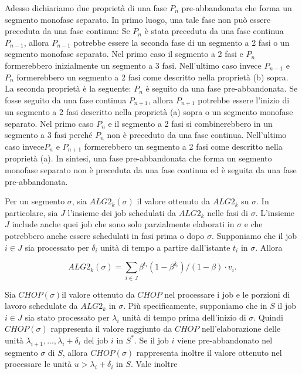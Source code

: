 \documentclass[12pt]{article}
\begin{document}
Adesso dichiariamo due proprietà di una fase $P_{n}$ pre-abbandonata che forma un segmento monofase separato. In primo luogo, una tale fase non può essere preceduta da una fase continua: Se $P_{n}$ è stata preceduta da una fase continua $P_{n-1}$, allora $P_{n-1}$ potrebbe essere la seconda fase di un segmento a 2 fasi o un segmento monofase separato. Nel primo caso il segmento a 2 fasi e $P_{n}$ formerebbero inizialmente un segmento a 3 fasi. Nell'ultimo caso invece $P_{n-1}$ e $P_{n}$ formerebbero un segmento a 2 fasi come descritto nella proprietà (b) sopra. La seconda proprietà è la seguente: $P_{n}$ è seguito da una fase pre-abbandonata. Se fosse seguito da una fase continua $P_{n+1}$, allora $P_{n+1}$ potrebbe essere l'inizio di un segmento a 2 fasi descritto nella proprietà (a) sopra o un segmento monofase separato. Nel primo caso $P_{n}$ e il segmento a 2 fasi si combinerebbero in un segmento a 3 fasi perché $P_{n}$ non è preceduto da una fase continua. Nell'ultimo caso invece$P_{n}$ e $P_{n+1}$ formerebbero un segmento a 2 fasi come descritto nella proprietà (a). In sintesi, una fase pre-abbandonata che forma un segmento monofase separato non è preceduta da una fase continua ed è seguita da una fase pre-abbandonata.

Per un segmento $\sigma$, sia $ALG2_{k}(\sigma)$ il valore ottenuto da $ALG2_{k}$ su $\sigma$. In particolare, sia $J$ l'insieme dei job schedulati da $ALG2_{k}$ nelle fasi di $\sigma$. L'insieme $J$ include anche quei job che sono solo parzialmente elaborati in $\sigma$ e che potrebbero anche essere schedulati in fasi prima o dopo $\sigma$. Supponiamo che il job $i \in J$ sia processato per $\delta_{i}$ unità di tempo a partire dall'istante $t_{i}$ in $\sigma$. Allora

$$ALG2_{k}(\sigma) = \sum_{i \in J} \beta^{t_{i}}(1 - \beta^{\delta_{i}})/(1 - \beta) \cdot v_{i}.$$

Sia $CHOP(\sigma)$il valore ottenuto da $CHOP$ nel processare i job  e le porzioni di lavoro schedulate da $ALG2_{k}$ in $\sigma$. Più specificamente, supponiamo che in $S$ il job $i \in J$ sia stato processato per $\lambda_{i}$ unità di tempo prima dell'inizio di $\sigma$. Quindi $CHOP(\sigma)$ rappresenta il valore raggiunto da $CHOP$ nell'elaborazione delle unità $\lambda_{i +1}, ..., \lambda_{i} + \delta_{i}$ del job $i$ in $S^{*}$. Se il job $i$ viene pre-abbandonato nel segmento $\sigma$ di $S$, allora $CHOP(\sigma)$ rappresenta inoltre il valore ottenuto nel processare le unità $u > \lambda_{i} + \delta_{i}$ in $S$. Vale inoltre
\end{document}
